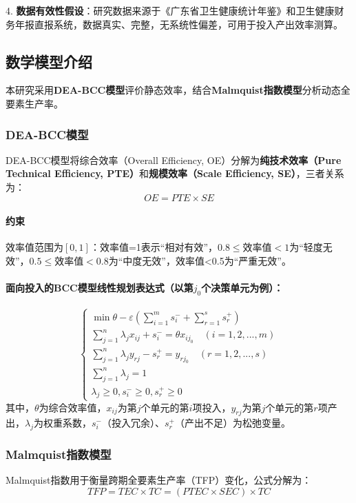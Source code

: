 \documentclass{MathNoteCN}
\begin{document}
4. \textbf{数据有效性假设}：研究数据来源于《广东省卫生健康统计年鉴》和卫生健康财务年报直报系统，数据真实、完整，无系统性偏差，可用于投入产出效率测算\cite{chen2025}。


\subsection{数学模型介绍}
本研究采用\textbf{DEA-BCC模型}评价静态效率，结合\textbf{Malmquist指数模型}分析动态全要素生产率。

\subsubsection{DEA-BCC模型}
DEA-BCC模型将综合效率（Overall Efficiency, OE）分解为\textbf{纯技术效率（Pure Technical Efficiency, PTE）}和\textbf{规模效率（Scale Efficiency, SE）}，三者关系为：
\[OE = PTE \times SE\]  
\paragraph{约束}效率值范围为$[0,1]$：效率值=1表示“相对有效”，$0.8 \leq \text{效率值}<1$为“轻度无效”，$0.5 \leq \text{效率值}<0.8$为“中度无效”，效率值<0.5为“严重无效”\cite{chen2025}。  
\paragraph{面向投入的BCC模型线性规划表达式（以第$j_0$个决策单元为例）：}  
  \[
  \begin{cases} 
  \min \theta - \varepsilon \left( \sum_{i=1}^m s_i^- + \sum_{r=1}^s s_r^+ \right) \\
  \sum_{j=1}^n \lambda_j x_{ij} + s_i^- = \theta x_{ij_0} \quad (i=1,2,...,m) \\
  \sum_{j=1}^n \lambda_j y_{rj} - s_r^+ = y_{rj_0} \quad (r=1,2,...,s) \\
  \sum_{j=1}^n \lambda_j = 1 \\
  \lambda_j \geq 0, s_i^- \geq 0, s_r^+ \geq 0 
  \end{cases}
  \]  
  其中，$\theta$为综合效率值，$x_{ij}$为第$j$个单元的第$i$项投入，$y_{rj}$为第$j$个单元的第$r$项产出，$\lambda_j$为权重系数，$s_i^-$（投入冗余）、$s_r^+$（产出不足）为松弛变量\cite{chen2025}。

\subsubsection{Malmquist指数模型}
Malmquist指数用于衡量跨期全要素生产率（TFP）变化，公式分解为：  
\[TFP = TEC \times TC = (PTEC \times SEC) \times TC\]
\end{document}
